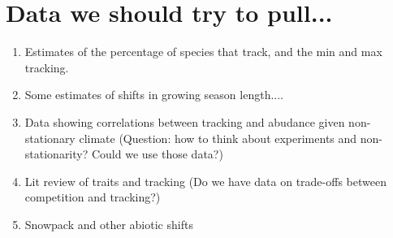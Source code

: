 \documentclass[11pt,letterpaper]{article}
\begin{document}
\section{Data we should try to pull...}
\begin{enumerate}
\item Estimates of the percentage of species that track, and the min and max tracking.
\item Some estimates of shifts in growing season length....
\item Data showing correlations between tracking and abudance given non-stationary climate (Question: how to think about experiments and non-stationarity? Could we use those data?)
\item Lit review of traits and tracking (Do we have data on trade-offs between competition and tracking?)
\item Snowpack and other abiotic shifts
\end{enumerate}
\end{document}
